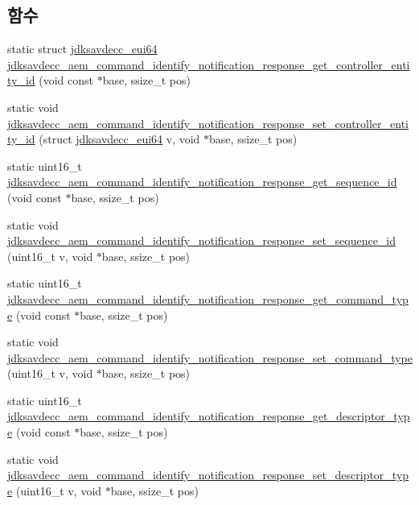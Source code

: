 \subsection*{함수}
\begin{DoxyCompactItemize}
\item 
static struct \hyperlink{structjdksavdecc__eui64}{jdksavdecc\+\_\+eui64} \hyperlink{group__command__identify__notification_ga39610c039df1babe11aaf24ee616791d}{jdksavdecc\+\_\+aem\+\_\+command\+\_\+identify\+\_\+notification\+\_\+response\+\_\+get\+\_\+controller\+\_\+entity\+\_\+id} (void const $\ast$base, ssize\+\_\+t pos)
\item 
static void \hyperlink{group__command__identify__notification_ga6d56d1a100be2c09d7ef38252dea682f}{jdksavdecc\+\_\+aem\+\_\+command\+\_\+identify\+\_\+notification\+\_\+response\+\_\+set\+\_\+controller\+\_\+entity\+\_\+id} (struct \hyperlink{structjdksavdecc__eui64}{jdksavdecc\+\_\+eui64} v, void $\ast$base, ssize\+\_\+t pos)
\item 
static uint16\+\_\+t \hyperlink{group__command__identify__notification_ga5ce7df5382a30d81ae1939171a62fd5a}{jdksavdecc\+\_\+aem\+\_\+command\+\_\+identify\+\_\+notification\+\_\+response\+\_\+get\+\_\+sequence\+\_\+id} (void const $\ast$base, ssize\+\_\+t pos)
\item 
static void \hyperlink{group__command__identify__notification_gad0d3c450d72843258e76b338b62c3a89}{jdksavdecc\+\_\+aem\+\_\+command\+\_\+identify\+\_\+notification\+\_\+response\+\_\+set\+\_\+sequence\+\_\+id} (uint16\+\_\+t v, void $\ast$base, ssize\+\_\+t pos)
\item 
static uint16\+\_\+t \hyperlink{group__command__identify__notification_gaa722b0ffb9ecb1954aff1204f987b896}{jdksavdecc\+\_\+aem\+\_\+command\+\_\+identify\+\_\+notification\+\_\+response\+\_\+get\+\_\+command\+\_\+type} (void const $\ast$base, ssize\+\_\+t pos)
\item 
static void \hyperlink{group__command__identify__notification_gace01f390bc63d798aadde9bde18eba9d}{jdksavdecc\+\_\+aem\+\_\+command\+\_\+identify\+\_\+notification\+\_\+response\+\_\+set\+\_\+command\+\_\+type} (uint16\+\_\+t v, void $\ast$base, ssize\+\_\+t pos)
\item 
static uint16\+\_\+t \hyperlink{group__command__identify__notification_gafe85c9a3954a07c40035d5e6aea0a674}{jdksavdecc\+\_\+aem\+\_\+command\+\_\+identify\+\_\+notification\+\_\+response\+\_\+get\+\_\+descriptor\+\_\+type} (void const $\ast$base, ssize\+\_\+t pos)
\item 
static void \hyperlink{group__command__identify__notification_ga5a7d6b3ee695593b349fb5b0a7a2547b}{jdksavdecc\+\_\+aem\+\_\+command\+\_\+identify\+\_\+notification\+\_\+response\+\_\+set\+\_\+descriptor\+\_\+type} (uint16\+\_\+t v, void $\ast$base, ssize\+\_\+t pos)

\end{DoxyCompactItemize}
